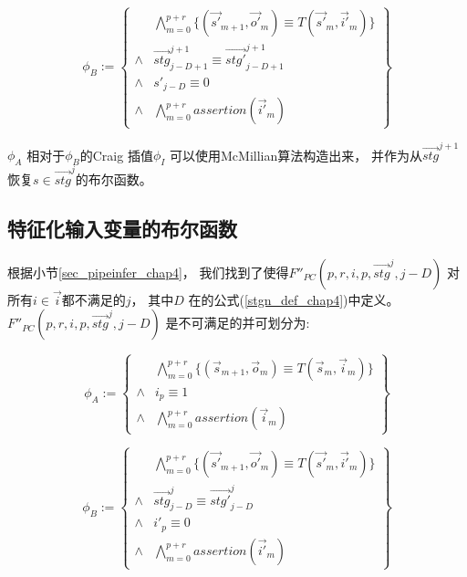 \begin{equation}
\phi_B :=
\left\{
\begin{array}{cc}
&\bigwedge_{m=0}^{p+r}
\{
(\vec{s'}_{m+1},\vec{o'}_m)\equiv T(\vec{s'}_m,\vec{i'}_m)
\}
\\
\wedge&\vec{stg}^{j+1}_{j-D+1}\equiv \vec{stg'}^{j+1}_{j-D+1} \\
\wedge& s'_{j-D}\equiv 0\\
\wedge&\bigwedge_{m=0}^{p+r}assertion(\vec{i'}_m)
\end{array}
\right\}
\end{equation}

$\phi_A$ 相对于$\phi_B$的Craig 插值$\phi_I$  可以使用McMillian算法构造出来，
并作为从$\vec{stg}^{j+1}$恢复$s\in \vec{stg}^{j}$的布尔函数。

\subsection{特征化输入变量的布尔函数}

根据小节\ref{sec_pipeinfer_chap4}，
我们找到了使得$F''_{PC}(p,r,i,p,\vec{stg}^{j},j-D)$ 对所有$i\in \vec{i}$都不满足的$j$，
其中$D$ 在的公式(\ref{stgn_def_chap4})中定义。
$F''_{PC}(p,r,i,p,\vec{stg}^{j},j-D)$ 是不可满足的并可划分为:

\begin{equation}
\phi_A:=
\left\{
\begin{array}{cc}
&\bigwedge_{m=0}^{p+r}
\{
(\vec{s}_{m+1},\vec{o}_m)\equiv T(\vec{s}_m,\vec{i}_m)
\}
\\
\wedge& i_{p}\equiv 1\\
\wedge&\bigwedge_{m=0}^{p+r}assertion(\vec{i}_m) 
\end{array}
\right\}
\end{equation}

\begin{equation}
\phi_B:=
\left\{
\begin{array}{cc}
&\bigwedge_{m=0}^{p+r}
\{
(\vec{s'}_{m+1},\vec{o'}_m)\equiv T(\vec{s'}_m,\vec{i'}_m)
\}
\\
\wedge&\vec{stg}^j_{j-D}\equiv \vec{stg'}^j_{j-D} \\
\wedge& i'_{p}\equiv 0\\
\wedge&\bigwedge_{m=0}^{p+r}assertion(\vec{i'}_m)
\end{array}
\right\}
\end{equation}

